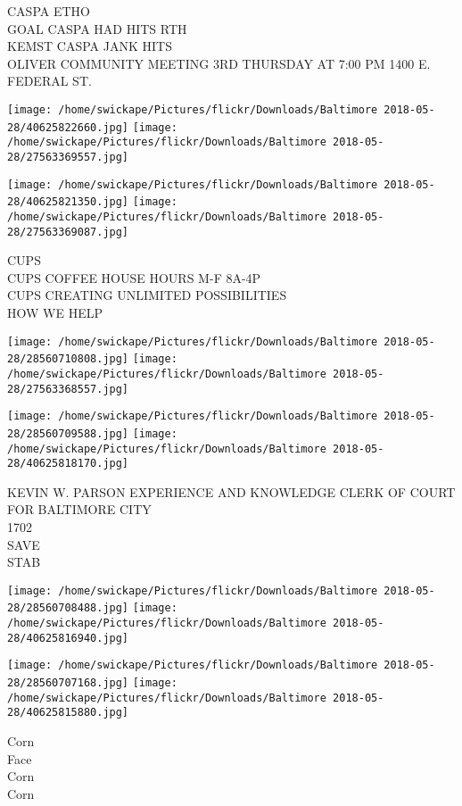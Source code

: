 \documentclass[10pt,letterpaper]{article}
\begin{document}
CASPA ETHO\\
GOAL CASPA HAD HITS RTH\\
KEMST CASPA JANK HITS\\
OLIVER COMMUNITY MEETING 3RD THURSDAY AT 7:00 PM 1400 E. FEDERAL ST.
\pagebreak

\texttt{[image: /home/swickape/Pictures/flickr/Downloads/Baltimore 2018-05-28/40625822660.jpg]}
\texttt{[image: /home/swickape/Pictures/flickr/Downloads/Baltimore 2018-05-28/27563369557.jpg]}

\texttt{[image: /home/swickape/Pictures/flickr/Downloads/Baltimore 2018-05-28/40625821350.jpg]}
\texttt{[image: /home/swickape/Pictures/flickr/Downloads/Baltimore 2018-05-28/27563369087.jpg]}

CUPS\\
CUPS COFFEE HOUSE HOURS M{-}F 8A{-}4P\\
CUPS CREATING UNLIMITED POSSIBILITIES\\
HOW WE HELP
\pagebreak

\texttt{[image: /home/swickape/Pictures/flickr/Downloads/Baltimore 2018-05-28/28560710808.jpg]}
\texttt{[image: /home/swickape/Pictures/flickr/Downloads/Baltimore 2018-05-28/27563368557.jpg]}

\texttt{[image: /home/swickape/Pictures/flickr/Downloads/Baltimore 2018-05-28/28560709588.jpg]}
\texttt{[image: /home/swickape/Pictures/flickr/Downloads/Baltimore 2018-05-28/40625818170.jpg]}

KEVIN W. PARSON EXPERIENCE AND KNOWLEDGE CLERK OF COURT FOR BALTIMORE CITY\\
1702\\
SAVE\\
STAB
\pagebreak

\texttt{[image: /home/swickape/Pictures/flickr/Downloads/Baltimore 2018-05-28/28560708488.jpg]}
\texttt{[image: /home/swickape/Pictures/flickr/Downloads/Baltimore 2018-05-28/40625816940.jpg]}

\texttt{[image: /home/swickape/Pictures/flickr/Downloads/Baltimore 2018-05-28/28560707168.jpg]}
\texttt{[image: /home/swickape/Pictures/flickr/Downloads/Baltimore 2018-05-28/40625815880.jpg]}

Corn\\
Face\\
Corn\\
Corn
\pagebreak
\end{document}
